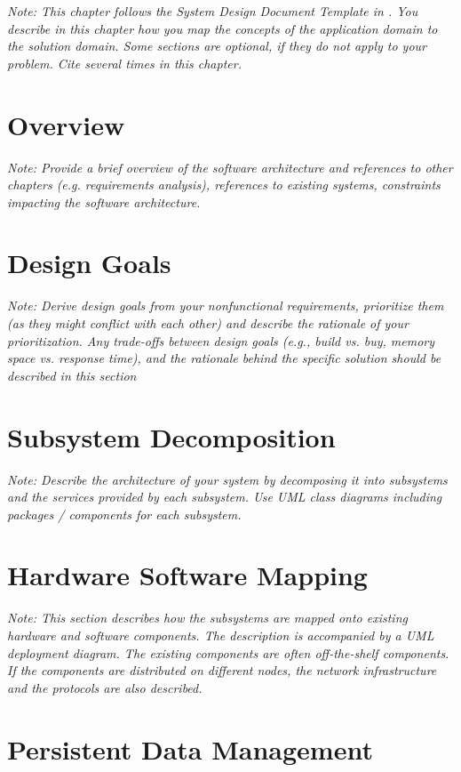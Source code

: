\documentclass[a4paper,12pt,twoside]{report}
\begin{document}
\textit{Note: This chapter follows the System Design Document Template in \cite{bruegge2004object}. 
You describe in this chapter how you map the concepts of the application domain to the solution domain. Some sections are optional, if they do not apply to your problem.
Cite \cite{bruegge2004object} several times in this chapter.}

\section{Overview}

\textit{Note: Provide a brief overview of the software architecture and references to other chapters (e.g. requirements analysis), references to existing systems, constraints impacting the software architecture.}

\section{Design Goals}

\textit{Note: Derive design goals from your nonfunctional requirements, prioritize them (as they might conflict with each other) and describe the rationale of your prioritization. Any trade-offs between design goals (e.g., build vs. buy, memory space vs. response time),
and the rationale behind the specific solution should be described in this section}

\section{Subsystem Decomposition}

\textit{Note: Describe the architecture of your system by decomposing it into subsystems and the services provided by each subsystem. Use UML class diagrams including packages / components for each subsystem.}

\section{Hardware Software Mapping}

\textit{Note: This section describes how the subsystems are mapped onto existing hardware and software components. The description is accompanied by a UML deployment diagram. The existing components are often off-the-shelf components. If the components are distributed on different nodes, the network infrastructure and the protocols are also described.}

\section{Persistent Data Management}
\end{document}
